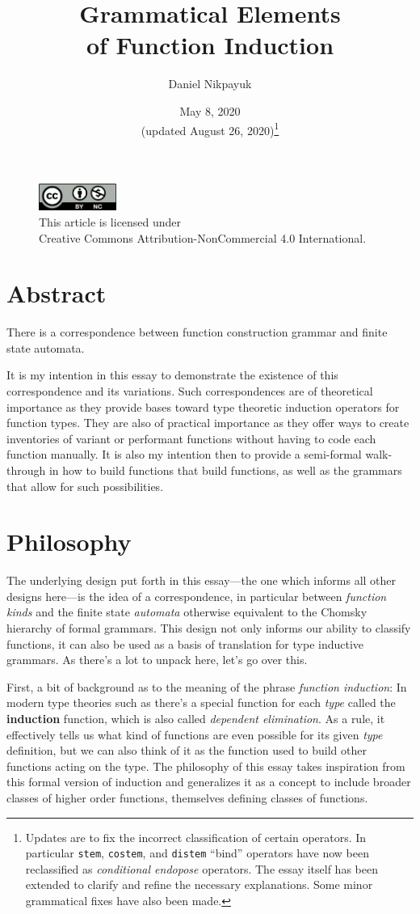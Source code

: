 \documentclass[twoside]{article}
\title{Grammatical Elements\\of Function Induction}
\author{Daniel Nikpayuk}
\date{May 8, 2020\\[2ex](updated August 26, 2020)\footnote{Updates are to fix the incorrect classification of certain operators.
In particular \texttt{stem}, \texttt{costem}, and \texttt{distem} ``bind'' operators have now been reclassified as
\emph{conditional endopose} operators. The essay itself has been extended to clarify and refine the necessary explanations.
Some minor grammatical fixes have also been made.}}
\newcommand{\strong}[1]{{\bfseries #1}}
\begin{document}
\maketitle
\thispagestyle{empty}

\begin{figure}[h]
\centering
\includegraphics[width=1in]{../cc-by-nc.png}\\[0.1in]
\tiny This article is licensed under \\
Creative Commons Attribution-NonCommercial 4.0 International.\\[0.3in]
\end{figure}

\section*{Abstract}

There is a correspondence between function construction grammar and finite state automata.

It is my intention in this essay to demonstrate the existence of this correspondence and its variations. Such correspondences
are of theoretical importance as they provide bases toward type theoretic induction operators for function types. They are
also of practical importance as they offer ways to create inventories of variant or performant functions without having
to code each function manually. It is also my intention then to provide a semi-formal walk-through in how to build
functions that build functions, as well as the grammars that allow for such possibilities.

\section*{Philosophy}

The underlying design put forth in this essay---the one which informs all other designs here---is the idea of
a correspondence, in particular between \emph{function kinds} and the finite state \emph{automata} otherwise equivalent
to the Chomsky hierarchy of formal grammars. This design not only informs our ability to classify functions, it can also
be used as a basis of translation for type inductive grammars. As there's a lot to unpack here, let's go over this.

First, a bit of background as to the meaning of the phrase \emph{function induction}: In modern type theories such as
\cite{hott} there's a special function for each \emph{type} called the \strong{induction} function, which is also called
\emph{dependent elimination}. As a rule, it effectively tells us what kind of functions are even possible for its given
\emph{type} definition, but we can also think of it as the function used to build other functions acting on the type.
The philosophy of this essay takes inspiration from this formal version of induction and generalizes it as a concept
to include broader classes of higher order functions, themselves defining classes of functions.
\end{document}
